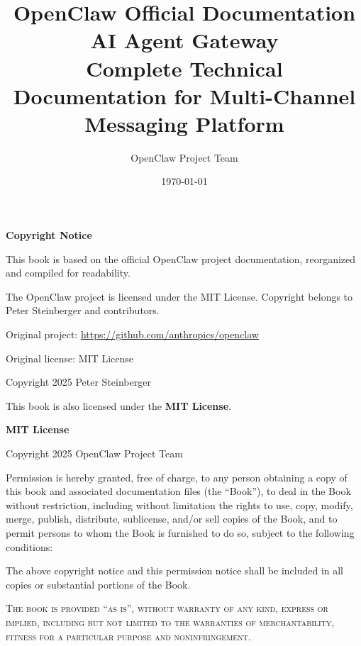 \documentclass[a4paper,12pt,openany]{book}
\title{
    \vspace{2cm}
{\Huge\textbf{OpenClaw Official Documentation}} \\
    \vspace{0.5cm}
    {\Large AI Agent Gateway} \\
    \vspace{0.5cm}
    {\large Complete Technical Documentation for Multi-Channel Messaging Platform}
    \vspace{2cm}
}
\author{OpenClaw Project Team}
\date{\today}
\begin{document}
\maketitle
\thispagestyle{empty}

\clearpage
\thispagestyle{empty}
\vspace*{\fill}
\begin{center}
{\large\textbf{Copyright Notice}}
\end{center}

\bigskip

\noindent This book is based on the official OpenClaw project documentation, reorganized and compiled for readability.

\medskip

\noindent The OpenClaw project is licensed under the MIT License. Copyright belongs to Peter Steinberger and contributors.

\medskip

\noindent Original project: \url{https://github.com/anthropics/openclaw}

\noindent Original license: MIT License

\noindent Copyright \textcopyright{} 2025 Peter Steinberger

\bigskip

\noindent This book is also licensed under the \textbf{MIT License}.

\bigskip

\noindent \textbf{MIT License}

\medskip

\noindent Copyright \textcopyright{} 2025 OpenClaw Project Team

\medskip

\noindent Permission is hereby granted, free of charge, to any person obtaining a copy
of this book and associated documentation files (the ``Book''), to deal
in the Book without restriction, including without limitation the rights
to use, copy, modify, merge, publish, distribute, sublicense, and/or sell
copies of the Book, and to permit persons to whom the Book is furnished to
do so, subject to the following conditions:

\medskip

\noindent The above copyright notice and this permission notice shall be included in all
copies or substantial portions of the Book.

\medskip

\noindent \textsc{The book is provided ``as is'', without warranty of any kind, express or
implied, including but not limited to the warranties of merchantability,
fitness for a particular purpose and noninfringement.}
\end{document}
